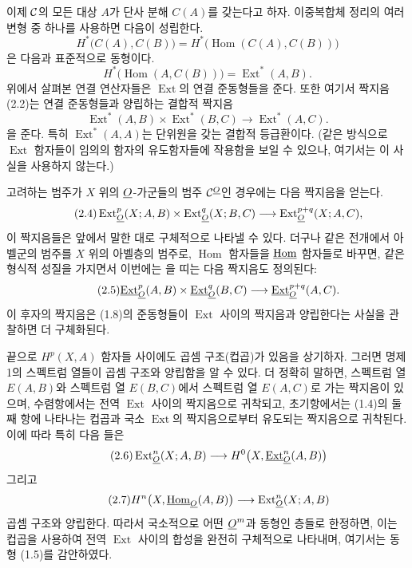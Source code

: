 이제 $\mathcal C$의 모든 대상 $A$가 단사 분해 $C(A)$를 갖는다고 하자.
이중복합체 정리의 여러 변형 중 하나를 사용하면 다음이 성립한다.
\[
  H^{*}\bigl(C(A),C(B)\bigr)
  =H^{*}\bigl(\operatorname{Hom}(C(A),C(B))\bigr)
\]
은 다음과 표준적으로 동형이다.
\[
  H^{*}\bigl(\operatorname{Hom}(A,C(B))\bigr)
  =\operatorname{Ext}^{*}(A,B).
\]
위에서 살펴본 연결 연산자들은 $\operatorname{Ext}$의 연결 준동형들을
준다. 또한 여기서 짝지음 (2.2)는 연결 준동형들과 양립하는 결합적
짝지음
\begin{equation}\tag{2.3}
  \operatorname{Ext}^{*}(A,B)\times\operatorname{Ext}^{*}(B,C)
  \longrightarrow\operatorname{Ext}^{*}(A,C).
\end{equation}
을 준다. 특히 $\operatorname{Ext}^{*}(A,A)$는 단위원을 갖는 결합적
등급환이다. (같은 방식으로 $\operatorname{Ext}$ 함자들이 임의의 함자의
유도함자들에 작용함을 보일 수 있으나, 여기서는 이 사실을 사용하지 않는다.)

고려하는 범주가 $X$ 위의
$\underline{O}$-가군들의 범주 $\mathcal C^{\underline{O}}$인 경우에는 다음 짝지음을 얻는다.
\begin{equation}\tag{2.4}
  \operatorname{Ext}_{\underline{O}}^{p}(X;A,B)
  \times\operatorname{Ext}_{\underline{O}}^{q}(X;B,C)
  \longrightarrow\operatorname{Ext}_{\underline{O}}^{p+q}(X;A,C),
\end{equation}
이 짝지음들은 앞에서 말한 대로 구체적으로 나타낼 수 있다. 더구나 같은
전개에서 아벨군의 범주를 $X$ 위의 아벨층의
범주로, $\operatorname{Hom}$ 함자들을
$\underline{\operatorname{Hom}}$ 함자들로 바꾸면, 같은 형식적 성질을 가지면서
이번에는 을 띠는 다음 짝지음도 정의된다:
\begin{equation}\tag{2.5}
  \underline{\operatorname{Ext}}_{\underline{O}}^{p}(A,B)\times\underline{\operatorname{Ext}}_{\underline{O}}^{q}(B,C)
  \longrightarrow\underline{\operatorname{Ext}}_{\underline{O}}^{p+q}(A,C).
\end{equation}
이 후자의 짝지음은 (1.8)의 준동형들이
$\operatorname{Ext}$ 사이의 짝지음과 양립한다는 사실을 관찰하면 더 구체화된다.

끝으로 $H^{p}(X,A)$ 함자들 사이에도 곱셈
구조(컵곱)가 있음을 상기하자. 그러면 명제 1의 스펙트럼 열들이
곱셈 구조와 양립함을 알 수 있다. 더
정확히 말하면, 스펙트럼 열 $E(A,B)$와 스펙트럼 열
$E(B,C)$에서 스펙트럼 열 $E(A,C)$로 가는 짝지음이 있으며, 수렴항에서는
전역 $\operatorname{Ext}$ 사이의 짝지음으로 귀착되고,
초기항에서는 (1.4)의 둘째 항에 나타나는
컵곱과 국소 $\operatorname{Ext}$의 짝지음으로부터 유도되는 짝지음으로 귀착된다. 이에 따라
특히 다음 들은
\begin{equation}\tag{2.6}
  \operatorname{Ext}_{\underline{O}}^{n}(X;A,B)
  \longrightarrow H^{0}\bigl(X,\underline{\operatorname{Ext}}_{\underline{O}}^{n}(A,B)\bigr)
\end{equation}
그리고
\begin{equation}\tag{2.7}
  H^{n}\bigl(X,\underline{\operatorname{Hom}}_{\underline{O}}(A,B)\bigr)
  \longrightarrow\operatorname{Ext}_{\underline{O}}^{n}(X;A,B)
\end{equation}
곱셈 구조와 양립한다. 따라서
국소적으로 어떤 $\underline{O}^{m}$과 동형인 층들로 한정하면, 이는
컵곱을 사용하여 전역 $\operatorname{Ext}$ 사이의 합성을 완전히 구체적으로 나타내며,
여기서는 동형 (1.5)를 감안하였다.

